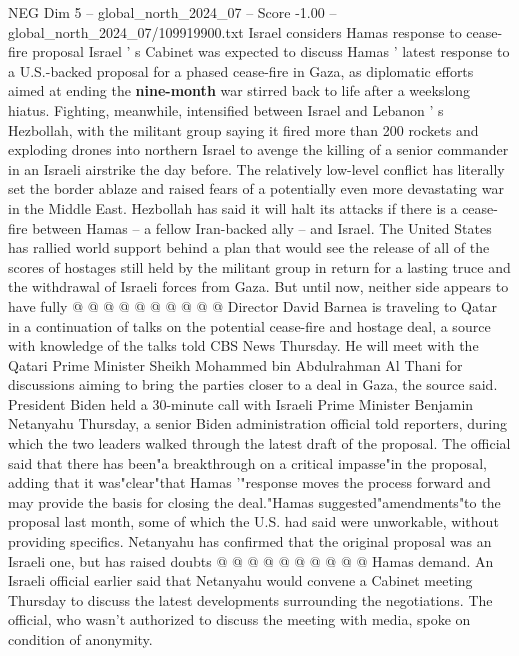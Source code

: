 \begin{textsample}{NEG Dim 5 – global\_north\_2024\_07 – Score -1.00 – global\_north\_2024\_07/109919900.txt}  \label{ex:f5_neg_142}
Israel considers Hamas response to cease-fire proposal Israel ' s Cabinet was expected to discuss Hamas ' latest response to a U.S.-backed proposal for a phased cease-fire in Gaza, as diplomatic efforts aimed at ending the \textbf{nine-month} war stirred back to life after a weekslong hiatus.
Fighting, meanwhile, intensified between Israel and Lebanon ' s Hezbollah, with the militant group saying it fired more than 200 rockets and exploding drones into northern Israel to avenge the killing of a senior commander in an Israeli airstrike the day before.
The relatively low-level conflict has literally set the border ablaze and raised fears of a potentially even more devastating war in the Middle East.
Hezbollah has said it will halt its attacks if there is a cease-fire between Hamas -- a fellow Iran-backed ally -- and Israel.
The United States has rallied world support behind a plan that would see the release of all of the scores of hostages still held by the militant group in return for a lasting truce and the withdrawal of Israeli forces from Gaza.
But until now, neither side appears to have fully @ @ @ @ @ @ @ @ @ @ Director David Barnea is traveling to Qatar in a continuation of talks on the potential cease-fire and hostage deal, a source with knowledge of the talks told CBS News Thursday.
He will meet with the Qatari Prime Minister Sheikh Mohammed bin Abdulrahman Al Thani for discussions aiming to bring the parties closer to a deal in Gaza, the source said.
President Biden held a 30-minute call with Israeli Prime Minister Benjamin Netanyahu Thursday, a senior Biden administration official told reporters, during which the two leaders walked through the latest draft of the proposal.
The official said that there has been"a breakthrough on a critical impasse"in the proposal, adding that it was"clear"that Hamas '"response moves the process forward and may provide the basis for closing the deal."Hamas suggested"amendments"to the proposal last month, some of which the U.S. had said were unworkable, without providing specifics.
Netanyahu has confirmed that the original proposal was an Israeli one, but has raised doubts @ @ @ @ @ @ @ @ @ @ Hamas demand.
An Israeli official earlier said that Netanyahu would convene a Cabinet meeting Thursday to discuss the latest developments surrounding the negotiations.
The official, who wasn't authorized to discuss the meeting with media, spoke on condition of anonymity.

\end{textsample}
